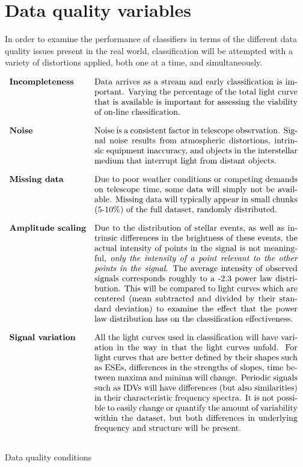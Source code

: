 	\section{Data quality variables}
		In order to examine the performance of classifiers in terms of the different data quality issues present in the real world, classification will be attempted with a variety of distortions applied, both one at a time, and simultaneously.
		\begin{table*}[ht!]
			\centering
			$
			\begin{array}{lp{0.7\textwidth}}
			\textbf{Incompleteness} & Data arrives as a stream and early classification is important. Varying the percentage of the total light curve that is available is important for assessing the viability of on-line classification.
			\vspace{10pt} \\
			\textbf{Noise} & Noise is a consistent factor in telescope observation. Signal noise results from atmospheric distortions, intrinsic equipment inaccuracy, and objects in the interstellar medium that interrupt light from distant objects.
			\vspace{10pt} \\
			\textbf{Missing data} & Due to poor weather conditions or competing demands on telescope time, some data will simply not be available. Missing data will typically appear in small chunks (5-10\%) of the full dataset, randomly distributed.
			\vspace{10pt} \\
			\textbf{Amplitude scaling} & Due to the distribution of stellar events, as well as intrinsic differences in the brightness of these events, the actual intensity of points in the signal is not meaningful, \emph{only the intensity of a point relevant to the other points in the signal}. The average intensity of observed signals corresponds roughly to a -2.3 power law distribution. This will be compared to light curves which are centered (mean subtracted and divided by their standard deviation) to examine the effect that the power law distribution has on the classification effectiveness.
			\vspace{10pt} \\  %
			\textbf{Signal variation} & All the light curves used in classification will have variation in the way in that the light curves unfold. For light curves that are better defined by their shapes such as ESEs, differences in the strengths of slopes, time between maxima and minima will change. Periodic signals such as IDVs will have differences (but also similarities) in their characteristic frequency spectra. It is not possible to easily change or quantify the amount of variability within the dataset, but both differences in underlying frequency and structure will be present.
			\vspace{10pt} \\
			\end{array}
			$
			\caption{Data quality conditions}
		\end{table*}
